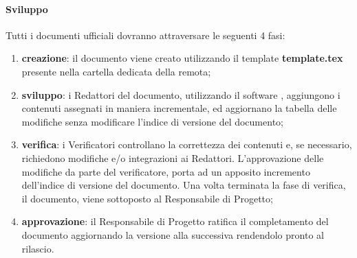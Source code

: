 		\paragraph{Sviluppo}
		Tutti i documenti ufficiali dovranno attraversare le seguenti 4 fasi:
		\begin{enumerate}
			\item \textbf{creazione}: il documento viene creato utilizzando il template \textbf{template.tex} presente nella cartella dedicata della  remota;
			\item \textbf{sviluppo}: i Redattori del documento, utilizzando il software , aggiungono i contenuti assegnati in maniera incrementale, ed aggiornano la tabella delle modifiche senza modificare l'indice di versione del documento;
			\item \textbf{verifica}: i Verificatori controllano la correttezza dei contenuti e, se necessario, richiedono modifiche e/o integrazioni ai Redattori. L'approvazione delle modifiche da parte del verificatore, porta ad un apposito incremento dell'indice di versione del documento. Una volta terminata la fase di verifica, il documento, viene sottoposto al Responsabile di Progetto;
			\item \textbf{approvazione}: il Responsabile di Progetto ratifica il completamento del documento aggiornando la versione alla  successiva rendendolo pronto al rilascio.
		\end{enumerate}

